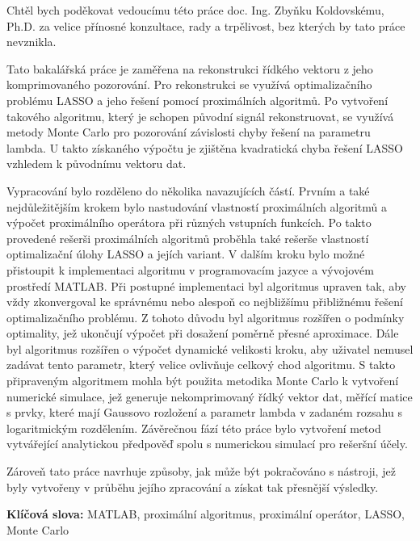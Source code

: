 \documentclass[FM,BP]{tulthesis}
\begin{document}
\begin{acknowledgement}
Chtěl bych poděkovat vedoucímu této práce doc. Ing. Zbyňku Koldovskému, Ph.D. za velice přínosné konzultace, rady a trpělivost, bez kterých by tato práce nevznikla.
\end{acknowledgement}
\clearpage
\begin{abstractCZ}
Tato bakalářská práce je zaměřena na rekonstrukci řídkého vektoru z jeho komprimovaného pozorování. Pro rekonstrukci se využívá optimalizačního problému LASSO a jeho řešení pomocí proximálních algoritmů. Po vytvoření takového algoritmu, který je schopen původní signál rekonstruovat, se využívá metody Monte Carlo pro pozorování závislosti chyby řešení na parametru lambda. U takto získaného výpočtu je zjištěna kvadratická chyba řešení LASSO vzhledem k původnímu vektoru dat.


Vypracování bylo rozděleno do několika navazujících částí. Prvním a také nejdůležitějším krokem bylo nastudování vlastností proximálních algoritmů a výpočet proximálního operátora při různých vstupních funkcích. Po takto provedené rešerši proximálních algoritmů proběhla také rešerše vlastností optimalizační úlohy LASSO a jejích variant. V dalším kroku bylo možné přistoupit k implementaci algoritmu v programovacím jazyce a vývojovém prostředí MATLAB. Při postupné implementaci byl algoritmus upraven tak, aby vždy zkonvergoval ke správnému nebo alespoň co nejbližšímu přibližnému řešení optimalizačního problému. Z tohoto důvodu byl algoritmus rozšířen o podmínky optimality, jež ukončují výpočet při dosažení poměrně přesné aproximace. Dále byl algoritmus rozšířen o výpočet dynamické velikosti kroku, aby uživatel nemusel zadávat tento parametr, který velice ovlivňuje celkový chod algoritmu. S takto připraveným algoritmem mohla být použita metodika Monte Carlo k vytvoření numerické simulace, jež generuje nekomprimovaný řídký vektor dat, měřící matice s prvky, které mají Gaussovo rozložení a parametr lambda v zadaném rozsahu s logaritmickým rozdělením. Závěrečnou fází této práce bylo vytvoření metod vytvářející analytickou předpověď spolu s numerickou simulací pro rešeršní účely.


Zároveň tato práce navrhuje způsoby, jak může být pokračováno s nástroji, jež byly vytvořeny v průběhu jejího zpracování a získat tak přesnější výsledky.


\textbf{Klíčová slova:} MATLAB, proximální algoritmus, proximální operátor, LASSO, Monte Carlo
\end{abstractCZ}
\vspace{2cm}
\end{document}

